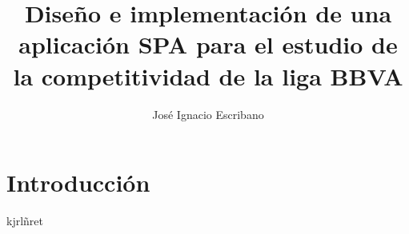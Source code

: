\documentclass[11pt]{beamer}
\author{José Ignacio Escribano}
\title{Diseño e implementación de una aplicación SPA para el estudio de la competitividad de la liga BBVA}
\institute{URJC}
\date{}
\begin{document}
	\maketitle
	
	\tableofcontents
	
	\section{Introducción}
	
	\begin{frame}
		kjrlñret
	\end{frame}
\end{document}
